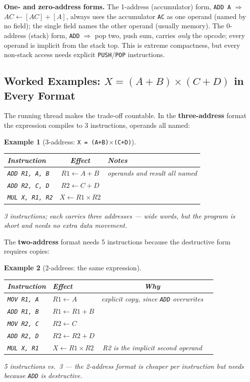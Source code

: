 \documentclass[11pt]{article}
\newtheorem{example}{Example}[section]
\begin{document}
\textbf{One- and zero-address forms.} The 1-address (accumulator) form, \texttt{ADD A} $\Rightarrow$ $AC \gets [AC]+[A]$, always uses the accumulator \texttt{AC} as one operand (named by no field); the single field names the other operand (usually memory). The 0-address (stack) form, \texttt{ADD} $\Rightarrow$ pop two, push sum, carries \emph{only} the opcode; every operand is implicit from the stack top. This is extreme compactness, but every non-stack access needs explicit \texttt{PUSH}/\texttt{POP} instructions.

\subsection{Worked Examples: $X = (A+B)\times(C+D)$ in Every Format}

The running thread makes the trade-off countable. In the \textbf{three-address} format the expression compiles to 3 instructions, operands all named:
\begin{example}[3-address: \texttt{X = (A+B)$\times$(C+D)}]
\begin{center}
\small
\begin{tabular}{@{}lcp{7cm}@{}}
\toprule
\textbf{Instruction} & \textbf{Effect} & \textbf{Notes} \\
\midrule
\texttt{ADD R1, A, B} & $R1 \gets A + B$ & operands and result all named \\
\texttt{ADD R2, C, D} & $R2 \gets C + D$ & \\
\texttt{MUL X, R1, R2} & $X \gets R1 \times R2$ & \\
\bottomrule
\end{tabular}
\end{center}
3 instructions; each carries three addresses --- wide words, but the program is short and needs no extra data movement.
\end{example}

The \textbf{two-address} format needs 5 instructions because the destructive form requires copies:
\begin{example}[2-address: the same expression]
\begin{center}
\small
\begin{tabular}{@{}llcp{7cm}@{}}
\toprule
\textbf{Instruction} & \textbf{Effect} & \textbf{Why} \\
\midrule
\texttt{MOV R1, A} & $R1 \gets A$ & explicit copy, since \texttt{ADD} overwrites \\
\texttt{ADD R1, B} & $R1 \gets R1 + B$ & \\
\texttt{MOV R2, C} & $R2 \gets C$ & \\
\texttt{ADD R2, D} & $R2 \gets R2 + D$ & \\
\texttt{MUL X, R1} & $X \gets R1 \times R2$ & R2 is the implicit second operand \\
\bottomrule
\end{tabular}
\end{center}
5 instructions vs.\ 3 --- the 2-address format is cheaper per instruction but needs  because \texttt{ADD} is destructive.
\end{example}
\end{document}
